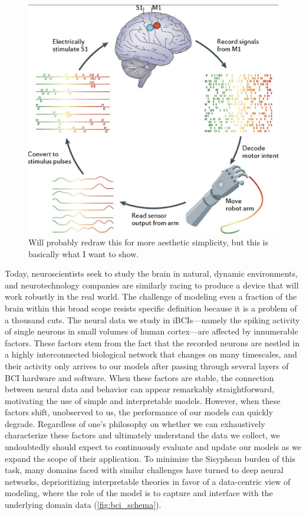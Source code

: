 \documentclass[12pt,oneside]{report}
\begin{document}
\begin{figure}[h]
  \centering
  \includegraphics[width=0.5\linewidth]{ch1_bci_loop.png}
  \caption{Will probably redraw this for more aesthetic simplicity, but this is basically what I want to show.}
  \label{fig:bci_loop}
\end{figure}

Today, neuroscientists seek to study the brain in natural, dynamic environments, and neurotechnology companies are similarly racing to produce a device that will work robustly in the real world. The challenge of modeling even a fraction of the brain within this broad scope resists specific definition because it is a problem of a thousand cuts. The neural data we study in iBCIs---namely the spiking activity of single neurons in small volumes of human cortex---are affected by innumerable factors. These factors stem from the fact that the recorded neurons are nestled in a highly interconnected biological network that changes on many timescales, and their activity only arrives to our models after passing through several layers of BCI hardware and software. When these factors are stable, the connection between neural data and behavior can appear remarkably straightforward, motivating the use of simple and interpretable models. However, when these factors shift, unobserved to us, the performance of our models can quickly degrade. Regardless of one’s philosophy on whether we can exhaustively characterize these factors and ultimately understand the data we collect, we undoubtedly should expect to continuously evaluate and update our models as we expand the scope of their application. To minimize the Sisyphean burden of this task, many domains faced with similar challenges have turned to deep neural networks, deprioritizing interpretable theories in favor of a data-centric view of modeling, where the role of the model is to capture and interface with the underlying domain data (\cref{fig:bci_schema}).
\end{document}
